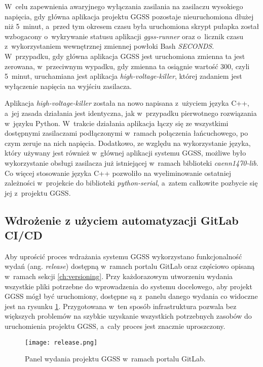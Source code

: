 W~celu zapewnienia awaryjnego wyłączania zasilania na zasilaczu wysokiego napięcia, gdy główna aplikacja projektu GGSS pozostaje nieuruchomiona dłużej niż 5~minut, a~przed tym okresem czasu była uruchomiona skrypt pułapka został wzbogacony o~wykrywanie statusu aplikacji \emph{ggss-runner} oraz o~licznik czasu z~wykorzystaniem wewnętrznej zmiennej powłoki Bash \emph{SECONDS}. W~przypadku, gdy główna aplikacja GGSS jest uruchomiona zmienna ta jest zerowana, w~przeciwnym wypadku, gdy zmienna ta osiągnie wartość 300, czyli 5~minut, uruchamiana jest aplikacja \emph{high-voltage-killer}, której zadaniem jest wyłączenie napięcia na wyjściu zasilacza.

Aplikacja \emph{high-voltage-killer} została na nowo napisana z~użyciem języka C++, a~jej zasada działania jest identyczna, jak w~przypadku pierwotnego rozwiązania w~języku Python. W~trakcie działania aplikacja łączy się ze wszystkimi dostępnymi zasilaczami podłączonymi w~ramach połączenia łańcuchowego, po czym zeruje na nich napięcia. Dodatkowo, ze względu na wykorzystanie języka, który używany jest również w~głównej aplikacji systemu GGSS, możliwe było wykorzystanie obsługi zasilacza już istniejącej w~ramach biblioteki \emph{caenn1470-lib}. Co więcej stosowanie języka C++ pozwoliło na wyeliminowanie ostatniej zależności w~projekcie do biblioteki \emph{python-serial}, a~zatem całkowite pozbycie się jej z~projektu GGSS.

\subsection{Wdrożenie z użyciem automatyzacji GitLab CI/CD}
Aby uprościć proces wdrażania systemu GGSS wykorzystano funkcjonalność wydań (ang. \emph{release}) dostępną w~ramach portalu GitLab oraz częściowo opisaną w~ramach sekcji \ref{ch:versioning}. Przy każdorazowym utworzeniu wydania wszystkie pliki potrzebne do wprowadzenia do systemu docelowego, aby projekt GGSS mógł być uruchomiony, dostępne są z~panelu danego wydania co widoczne jest na rysunku \ref{fig:release}. Przygotowana w~ten sposób infrastruktura pozwala bez większych problemów na szybkie uzyskanie wszystkich potrzebnych zasobów do uruchomienia projektu GGSS, a~cały proces jest znacznie uproszczony.

\begin{figure}[H]
    \centering
    \texttt{[image: release.png]}
    \caption{Panel wydania projektu GGSS w~ramach portalu GitLab.}
    \label{fig:release}
\end{figure}

